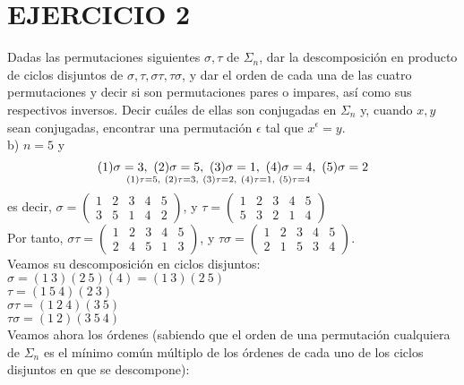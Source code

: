 \documentclass{article}
\begin{document}
\section*{EJERCICIO 2}

Dadas las permutaciones siguientes $\sigma , \tau $ de $\Sigma_n$, dar la descomposición en producto de ciclos disjuntos de $\sigma, \tau, \sigma\tau, \tau\sigma$, y dar el orden de cada una de las cuatro permutaciones y decir si son permutaciones pares o impares, así como sus respectivos inversos. Decir cuáles de ellas son conjugadas en $\Sigma_n$ y, cuando $x, y$ sean conjugadas, encontrar una permutación $\epsilon$ tal que $x^\epsilon = y$.\\

b) $n = 5$ y
$$
(1)\sigma = 3, \ (2)\sigma = 5, \ (3)\sigma = 1, \ (4)\sigma = 4, \ (5)\sigma = 2 \atop
(1)\tau = 5, \ (2)\tau = 3, \ (3)\tau = 2, \ (4)\tau = 1, \ (5)\tau = 4 \\
$$
es decir, $\sigma = \left(
\begin{array}{ccccc}
  1 & 2 & 3 & 4 & 5 \\
  3 & 5 & 1 & 4 & 2
\end{array} \right)
$, y $\tau = \left(
  \begin{array}{ccccc}
    1 & 2 & 3 & 4 & 5 \\
    5 & 3 & 2 & 1 & 4
\end{array} \right)
$\\
Por tanto, $\sigma \tau = \left(
  \begin{array}{ccccc}
    1 & 2 & 3 & 4 & 5 \\
    2 & 4 & 5 & 1 & 3
\end{array} \right)
$, y $\tau \sigma = \left(
  \begin{array}{ccccc}
    1 & 2 & 3 & 4 & 5 \\
    2 & 1 & 5 & 3 & 4
\end{array} \right)
$.\\
Veamos su descomposición en ciclos disjuntos:\\
$\sigma = (1 \ 3)(2 \ 5)(4) = (1 \ 3)(2 \ 5)$\\
$\tau = (1 \ 5 \ 4)(2 \ 3)$\\
$\sigma \tau = (1 \ 2 \ 4)(3 \ 5)$\\
$\tau \sigma = (1 \ 2)(3 \ 5 \ 4)$\\
Veamos ahora los órdenes (sabiendo que el orden de una permutación cualquiera de $\Sigma_n$ es el mínimo común múltiplo de los órdenes de cada uno de los ciclos disjuntos en que se descompone):\\
\end{document}
